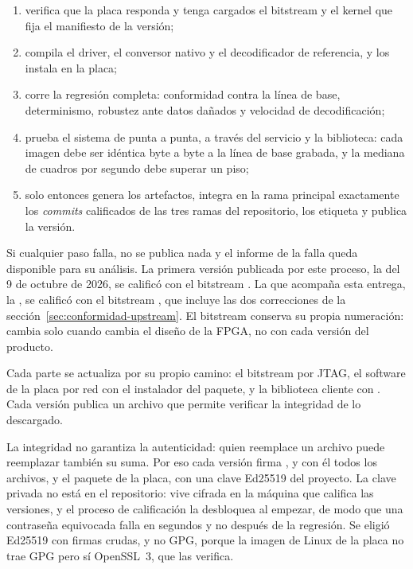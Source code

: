 \begin{enumerate}
  \item verifica que la placa responda y tenga cargados el bitstream y el
    kernel que fija el manifiesto de la versión;
  \item compila el driver, el conversor nativo y el decodificador de
    referencia, y los instala en la placa;
  \item corre la regresión completa: conformidad contra la línea de base,
    determinismo, robustez ante datos dañados y velocidad de decodificación;
  \item prueba el sistema de punta a punta, a través del servicio y la
    biblioteca: cada imagen debe ser idéntica byte a byte a la línea de base
    grabada, y la mediana de cuadros por segundo debe superar un piso;
  \item solo entonces genera los artefactos, integra en la rama principal
    exactamente los \emph{commits} calificados de las tres ramas del
    repositorio, los etiqueta y publica la versión.
\end{enumerate}

Si cualquier paso falla, no se publica nada y el informe de la falla queda
disponible para su análisis. La primera versión publicada por este proceso,
la  del 9 de octubre de 2026, se calificó con el bitstream
. La que acompaña esta entrega, la , se
calificó con el bitstream , que incluye las dos
correcciones de la sección~\ref{sec:conformidad-upstream}. El bitstream
conserva su propia numeración: cambia solo cuando cambia el diseño de la
FPGA, no con cada versión del producto.

Cada parte se actualiza por su propio camino: el bitstream por JTAG, el
software de la placa por red con el instalador del paquete, y la biblioteca
cliente con . Cada versión publica un archivo  que
permite verificar la integridad de lo descargado.

La integridad no garantiza la autenticidad: quien reemplace un archivo
puede reemplazar también su suma. Por eso cada versión firma
, y con él todos los archivos, y el paquete de la placa,
con una clave Ed25519 del proyecto. La clave privada no está en el
repositorio: vive cifrada en la máquina que califica las versiones, y el
proceso de calificación la desbloquea al empezar, de modo que una
contraseña equivocada falla en segundos y no después de la regresión. Se
eligió Ed25519 con firmas crudas, y no GPG, porque la imagen de Linux de la
placa no trae GPG pero sí OpenSSL~3, que las verifica.

